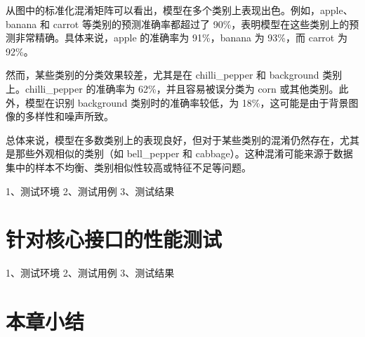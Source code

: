 从图中的标准化混淆矩阵可以看出，模型在多个类别上表现出色。例如，apple、banana 和 carrot 等类别的预测准确率都超过了 90\%，表明模型在这些类别上的预测非常精确。具体来说，apple 的准确率为 91\%，banana 为 93\%，而 carrot 为 92\%。

然而，某些类别的分类效果较差，尤其是在 chilli\_pepper 和 background 类别上。chilli\_pepper 的准确率为 62\%，并且容易被误分类为 corn 或其他类别。此外，模型在识别 background 类别时的准确率较低，为 18\%，这可能是由于背景图像的多样性和噪声所致。

总体来说，模型在多数类别上的表现良好，但对于某些类别的混淆仍然存在，尤其是那些外观相似的类别（如 bell\_pepper 和 cabbage）。这种混淆可能来源于数据集中的样本不均衡、类别相似性较高或特征不足等问题。


1、测试环境
2、测试用例
3、测试结果

\section{针对核心接口的性能测试}

1、测试环境
2、测试用例
3、测试结果

\section{本章小结}